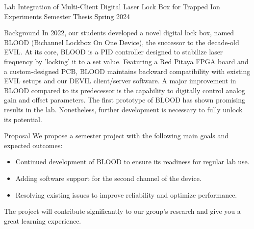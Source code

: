 \documentclass{project-proposal}
\begin{document}
\setmaintextfont
\makepage

\makeheader
{Lab Integration of Multi-​Client Digital Laser Lock Box for Trapped Ion Experiments} %
{Semester Thesis} %
{Spring 2024} %

\begin{section}{Background}
 In 2022, our students developed a novel digital lock box, named BLOOD (Bichannel
 Lockbox On One Device), the successor to the decade-old EVIL. At its core, BLOOD is a
 PID controller designed to stabilize laser frequency by 'locking' it to a set value.
 Featuring a Red Pitaya FPGA board and a custom-designed PCB, BLOOD maintains backward
 compatibility with existing EVIL setups and our DEVIL client/server software. A major
 improvement in BLOOD compared to its predecessor is the capability to digitally
 control analog gain and offset parameters. The first prototype of BLOOD has shown
 promising results in the lab. Nonetheless, further development is necessary to fully
 unlock its potential.
\end{section}

\begin{section}{Proposal}
 We propose a semester project with the following main goals and expected outcomes:

 \begin{itemize}
     \item {Continued development of BLOOD to ensure its readiness for regular lab use.}
     \item {Adding software support for the second channel of the device.}
     \item {Resolving existing issues to improve reliability and optimize performance.}
 \end{itemize}

 The project will contribute significantly to our group's research and
 give you a great learning experience.
\end{section}
\end{document}
